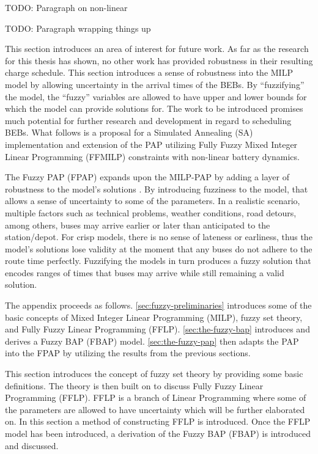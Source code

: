 \documentclass[ee,thesis]{usuthesis}
\begin{document}
TODO: Paragraph on non-linear

TODO: Paragraph wrapping things up

\makeappendices
{}
\label{sec:fuzzy-sa-pap}

This section introduces an area of interest for future work. As far as the research for this thesis has shown, no other
work has provided robustness in their resulting charge schedule. This section introduces a sense of robustness into the
MILP model by allowing uncertainty in the arrival times of the BEBs. By “fuzzifying” the model, the “fuzzy” variables
are allowed to have upper and lower bounds for which the model can provide solutions for. The work to be introduced
promises much potential for further research and development in regard to scheduling BEBs. What follows is a proposal
for a Simulated Annealing (SA) implementation and extension of the PAP utilizing Fully Fuzzy Mixed Integer Linear
Programming (FFMILP) constraints with non-linear battery dynamics.

The Fuzzy PAP (FPAP) expands upon the MILP-PAP by adding a layer of robustness to the model's solutions
\cite{bello-2019-fuzzy-activ,kaur-2016-introd-fuzzy}. By introducing fuzziness to the model, that allows a sense of
uncertainty to some of the parameters. In a realistic scenario, multiple factors such as technical problems, weather
conditions, road detours, among others, buses may arrive earlier or later than anticipated to the station/depot. For
crisp models, there is no sense of lateness or earliness, thus the model's solutions lose validity at the moment that
any buses do not adhere to the route time perfectly. Fuzzifying the models in turn produces a fuzzy solution that
encodes ranges of times that buses may arrive while still remaining a valid solution.

The appendix proceeds as follows. \ref{sec:fuzzy-preliminaries} introduces some of the basic concepts of Mixed Integer
Linear Programming (MILP), fuzzy set theory, and Fully Fuzzy Linear Programming (FFLP). \ref{sec:the-fuzzy-bap}
introduces and derives a Fuzzy BAP (FBAP) model. \ref{sec:the-fuzzy-pap} then adapts the PAP into the FPAP by utilizing
the results from the previous sections.

\label{sec:fuzzy-preliminaries}

This section introduces the concept of fuzzy set theory by providing some basic definitions. The theory is then built on to discuss Fully Fuzzy Linear Programming (FFLP). FFLP is a branch of Linear Programming where some of the parameters are allowed to have uncertainty which will be further elaborated on. In this section a method of constructing FFLP is introduced. Once the FFLP model has been introduced, a derivation of the Fuzzy BAP (FBAP) is introduced and discussed.
\end{document}
